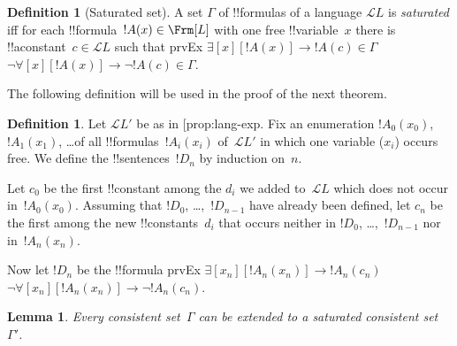 \documentclass[10pt,a4paper]{article}
\makeatletter
\theoremstyle{plain}
\newtheorem{lem}[thm]{Lemma}
\theoremstyle{definition}
\newtheorem{defn}[thm]{Definition}
\theoremstyle{remark}
\newcommand*{\ollabel}[1]{\label{#1}}
\newcommand{\olref}{\@ifnextchar[{\olref@i}{\olref@final}}
\def\olref@i[#1]{\@ifnextchar[{\olref@ii}{\olref@final}}
\def\olref@ii[#1]{\@ifnextchar[{\olref@iii}{\olref@final}}
\def\olref@iii[#1]{\olref@final}
\def\olref@final#1{\ref{#1}}
\providecommand{\lif}{\mathbin{\rightarrow}}
\providecommand{\lforall}{\mathord{\forall}}
\providecommand{\lexists}{\mathord{\exists}}
\providecommand{\Obj}{}
\providecommand{\Lang}{\ensuremath{\mathcal{L}}}
\providecommand{\iftag}[1]{#1}
\makeatother
\begin{document}
\begin{defn}[Saturated set]
A set $\Gamma$ of !!{formula}s of a language $\Lang {L}$ is
\emph{saturated} iff for each !!{formula}~$!A(x) \in \Frm[L]$ with one
free !!{variable}~$x$ there is !!a{constant}~$c \in \Lang{L}$ such
that
\iftag{prvEx}
      {$\lexists[x][!A(x)] \lif !A(c) \in \Gamma$}
      {$\lnot\lforall[x][!A(x)] \lif \lnot !A(c) \in \Gamma$}.
\end{defn}

The following definition will be used in the proof of the next theorem.

\begin{defn}
\ollabel{defn:henkin-exp}
Let $\Lang L'$ be as in \olref{prop:lang-exp}.  Fix an enumeration
$!A_0(x_0)$, $!A_1(x_1)$, \dots of all !!{formula}s~$!A_i(x_i)$
of~$\Lang L'$ in which one variable ($x_i$) occurs free.  We define
the !!{sentence}s~$!D_n$ by induction on~$n$.

Let $c_0$ be the first !!{constant} among the $\Obj d_i$ we added
to~$\Lang{L}$ which does not occur in~$!A_0(x_0)$.  Assuming that
$!D_0$, \dots,~$!D_{n-1}$ have already been defined, let $c_n$ be the
first among the new !!{constant}s~$\Obj d_i$ that occurs neither in
$!D_0$, \dots,~$!D_{n-1}$ nor in~$!A_n(x_n)$.

Now let $!D_{n}$ be the !!{formula} \iftag{prvEx}
{$\lexists[x_{n}][!A_{n}(x_{n})] \lif
  !A_{n}(c_{n})$}{$\lnot\lforall[x_{n}][!A_{n}(x_{n})] \lif \lnot
  !A_{n}(c_{n})$}.
\end{defn}

\begin{lem}
\ollabel{lem:henkin}
Every consistent set~$\Gamma$ can be extended to a saturated
consistent set~$\Gamma'$.
\end{lem}
\end{document}
